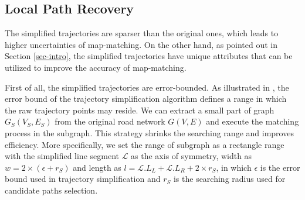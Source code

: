\subsection{Local Path Recovery}
\label{sec:route}

The simplified trajectories are sparser than the original ones, which leads to higher uncertainties of map-matching.
On the other hand, as pointed out in Section \ref{sec-intro}, the simplified trajectories have unique attributes that can be utilized to improve the accuracy of map-matching.

First of all, the simplified trajectories are error-bounded. As illustrated in
, the error bound of the trajectory simplification algorithm defines a range in which the raw
trajectory points may reside. We can extract a small part of graph $G_S(V_S,E_S)$
from the original road network $G(V,E)$ and execute the matching process in the subgraph. This strategy shrinks the searching range and
improves efficiency.
More specifically, we set the range of subgraph as a rectangle range
with the simplified line segment $\mathcal{L}$ as the axis of symmetry, width as $w =
2\times(\epsilon + r_S)$ and length as $l = \mathcal{L}.L_L + \mathcal{L}.L_R +
2\times r_S$, in which $\epsilon$ is the error bound used in trajectory
simplification and $r_S$ is the searching radius used for candidate paths selection.







